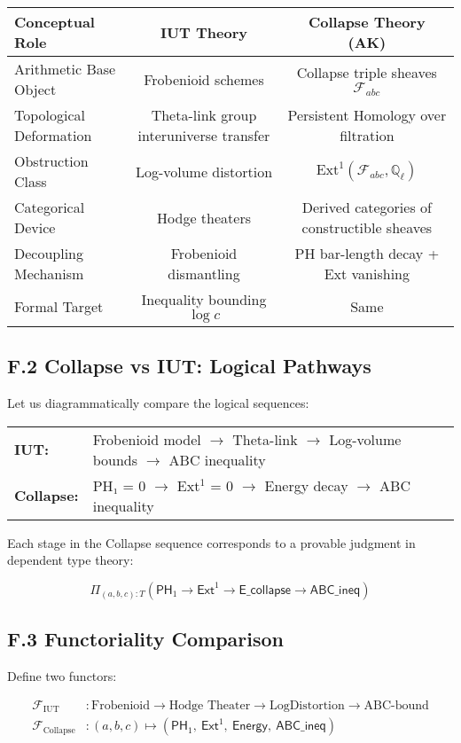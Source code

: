 \documentclass[11pt]{article}
\begin{document}
\begin{tabular}{|l|c|c|}
\hline
\textbf{Conceptual Role} & \textbf{IUT Theory} & \textbf{Collapse Theory (AK)} \\
\hline
Arithmetic Base Object & Frobenioid schemes & Collapse triple sheaves \( \mathcal{F}_{abc} \) \\
Topological Deformation & Theta-link group interuniverse transfer & Persistent Homology over filtration \\
Obstruction Class & Log-volume distortion & \( \mathrm{Ext}^1(\mathcal{F}_{abc}, \mathbb{Q}_\ell) \) \\
Categorical Device & Hodge theaters & Derived categories of constructible sheaves \\
Decoupling Mechanism & Frobenioid dismantling & PH bar-length decay + Ext vanishing \\
Formal Target & Inequality bounding \( \log c \) & Same \\
\hline
\end{tabular}

\subsection*{F.2 Collapse vs IUT: Logical Pathways}

Let us diagrammatically compare the logical sequences:

\begin{center}
\begin{tabular}{ll}
\textbf{IUT:} & Frobenioid model \(\to\) Theta-link \(\to\) Log-volume bounds \(\to\) ABC inequality \\
\textbf{Collapse:} & PH₁ = 0 \(\to\) Ext$^1$ = 0 \(\to\) Energy decay \(\to\) ABC inequality \\
\end{tabular}
\end{center}

Each stage in the Collapse sequence corresponds to a provable judgment in dependent type theory:

\[
\Pi_{(a,b,c):T} \left( \mathsf{PH}_1 \to \mathsf{Ext}^1 \to \mathsf{E\_collapse} \to \mathsf{ABC\_ineq} \right)
\]

\subsection*{F.3 Functoriality Comparison}

Define two functors:

\begin{align*}
\mathcal{F}_{\mathrm{IUT}} &: \text{Frobenioid} \to \text{Hodge Theater} \to \text{LogDistortion} \to \text{ABC-bound} \\
\mathcal{F}_{\mathrm{Collapse}} &: (a,b,c) \mapsto \left( \mathsf{PH}_1,\ \mathsf{Ext}^1,\ \mathsf{Energy},\ \mathsf{ABC\_ineq} \right)
\end{align*}
\end{document}
